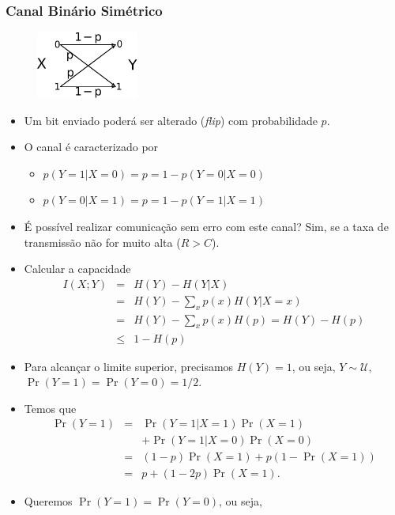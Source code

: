 \begin{frame}[allowframebreaks]
  \frametitle{Canal Binário Simétrico}
                \begin{figure}[h!]
                \centering
                \includegraphics[width=0.3\textwidth]{images/bsch.pdf}
                \label{fig:bsch}
                \end{figure}

  \begin{itemize}
  \item Um bit enviado poderá ser alterado (\textit{flip}) com probabilidade $p$.
  \item O canal é caracterizado por
	\begin{itemize}
	\item $p(Y=1|X=0) = p = 1 -p(Y=0|X=0)$
	\item $p(Y=0|X=1) = p = 1 -p(Y=1|X=1)$
  	\end{itemize}
  \item É possível realizar comunicação sem erro com este canal?
	Sim, se a taxa de transmissão não for muito alta ($R>C$).
  \item Calcular a capacidade
	\begin{eqnarray}
	I(X;Y) &=& H(Y) - H(Y|X) \nonumber \\
		 &=&  H(Y) - \sum_x p(x) H(Y|X=x) \nonumber \\
		&=& H(Y) - \sum_x p(x) H(p) = H(Y) - H(p) \nonumber \\
		&\leq& 1 - H(p)
	\end{eqnarray}
  \item Para alcançar o limite superior, precisamos $H(Y)=1$, ou seja, $Y \sim \mathcal{U}$,
	$\Pr(Y=1) = \Pr(Y=0) = 1/2$.
  \item Temos que
	\begin{eqnarray}
	\Pr(Y=1) &=& \Pr(Y=1|X=1) \Pr(X=1) \nonumber \\
		&& + \Pr(Y=1|X=0) \Pr(X=0) \nonumber \\
		&=& (1-p) \Pr(X=1) + p (1 - \Pr(X=1)) \nonumber \\
		&=& p + (1 - 2p) \Pr(X=1) .
	\end{eqnarray}
  \item Queremos $\Pr(Y=1) = \Pr(Y=0)$, ou seja,

\end{itemize}
\end{frame}
